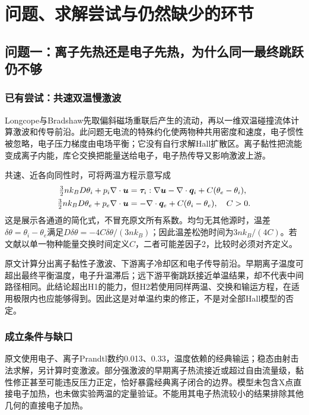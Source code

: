 \chapter{问题、求解尝试与仍然缺少的环节}
\section{问题一：离子先热还是电子先热，为什么同一最终跳跃仍不够}
\subsection{已有尝试：共速双温慢激波}
Longcope与Bradshaw先取偏斜磁场重联后产生的流动，再以一维双温碰撞流体计算激波和传导前沿。此问题无电流的特殊约化使两物种共用密度和速度，电子惯性被忽略，电子压力梯度由电场平衡；它没有自行求解Hall扩散区。离子黏性把流能变成离子内能，库仑交换把能量送给电子，电子热传导又影响激波上游。\citep{L164}

共速、近各向同性时，可将两温方程示意写成
\begin{align}
\tfrac32nk_BD\theta_i+p_i\nabla\cdot\bm{u}
 &=\bm{\tau}_i:\nabla\bm{u}-\nabla\cdot\bm{q}_i+C(\theta_e-\theta_i),\\
\tfrac32nk_BD\theta_e+p_e\nabla\cdot\bm{u}
 &=-\nabla\cdot\bm{q}_e+C(\theta_i-\theta_e),\quad C>0.
\end{align}
这是展示各通道的简化式，不冒充原文所有系数。均匀无其他源时，温差$\delta\theta=\theta_i-\theta_e$满足$D\delta\theta=-4C\delta\theta/(3nk_B)$；因此温差松弛时间为$3nk_B/(4C)$。若文献以单一物种能量交换时间定义$C$，二者可能差因子2，比较时必须对齐定义。

原文计算分出离子黏性子激波、下游离子冷却区和电子传导前沿。早期离子温度可超出最终平衡温度，电子升温滞后；远下游平衡跳跃接近单温结果，却不代表中间路径相同。此结论超出H1的能力，但H2若使用同样两温、交换和输运方程，在适用极限内也应能够得到。因此这是对单温约束的修正，不是对全部Hall模型的否定。

\subsection{成立条件与缺口}
原文使用电子、离子Prandtl数约0.013、0.33，温度依赖的经典输运；稳态由射击法求解，另计算时变激波。部分强激波的早期离子热流接近或超过自由流量级，黏性修正甚至可能违反压力正定，恰好暴露经典离子闭合的边界。模型未包含X点直接电子加热，也未做实验两温的定量验证。不能用其电子热流较小的结果排除其他几何的直接电子加热。

